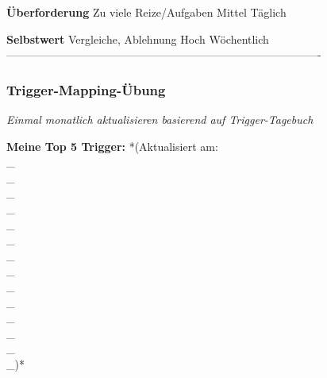 \textbf{Überforderung}    Zu viele Reize/Aufgaben    Mittel             Täglich

\textbf{Selbstwert}       Vergleiche, Ablehnung      Hoch               Wöchentlich
-------------------------------------------------------------------------------------

\subsubsection{\textbf{\textcolor{ctmmRed}{Trigger}-Mapping-Übung}}

\textit{\textcolor{ctmmYellow}{} Einmal monatlich aktualisieren basierend auf \textcolor{ctmmRed}{Trigger}-Tagebuch}

\textbf{Meine Top 5 \textcolor{ctmmRed}{Trigger}:} *(Aktualisiert am:
\\\_\\\_\\\_\\\_\\\_\\\_\\\_\\\_\\\_\\\_\\\_\\\_\\\_\\\_)*

